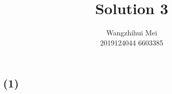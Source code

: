 \documentclass[12pt]{article}%
\begin{document}
\title{Solution 3}
\author{Wangzhihui Mei \\ 2019124044 6603385}
\date{}
\maketitle

\subsection*{(1)}

\clearpage
\end{document}
